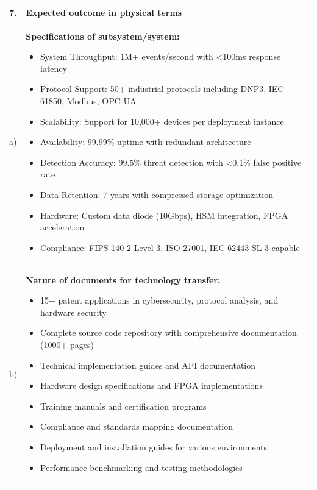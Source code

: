 \documentclass[12pt,a4paper]{article}
\begin{document}
\begin{longtable}{|p{0.5cm}p{3cm}|p{11cm}|}
\multicolumn{2}{|l|}{\textbf{7.}} & \textbf{Expected outcome in physical terms} \\
\multicolumn{2}{|l|}{a)} & \textbf{Specifications of subsystem/system:}
\begin{itemize}[leftmargin=1em, itemsep=0pt]
    \item System Throughput: 1M+ events/second with <100ms response latency
    \item Protocol Support: 50+ industrial protocols including DNP3, IEC 61850, Modbus, OPC UA
    \item Scalability: Support for 10,000+ devices per deployment instance
    \item Availability: 99.99\% uptime with redundant architecture
    \item Detection Accuracy: 99.5\% threat detection with <0.1\% false positive rate
    \item Data Retention: 7 years with compressed storage optimization
    \item Hardware: Custom data diode (10Gbps), HSM integration, FPGA acceleration
    \item Compliance: FIPS 140-2 Level 3, ISO 27001, IEC 62443 SL-3 capable
\end{itemize} \\

\multicolumn{2}{|l|}{b)} & \textbf{Nature of documents for technology transfer:}
\begin{itemize}[leftmargin=1em, itemsep=0pt]
    \item 15+ patent applications in cybersecurity, protocol analysis, and hardware security
    \item Complete source code repository with comprehensive documentation (1000+ pages)
    \item Technical implementation guides and API documentation
    \item Hardware design specifications and FPGA implementations
    \item Training manuals and certification programs
    \item Compliance and standards mapping documentation
    \item Deployment and installation guides for various environments
    \item Performance benchmarking and testing methodologies
\end{itemize} \\


\end{longtable}
\end{document}
